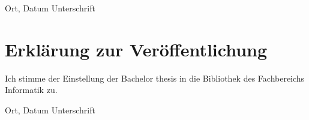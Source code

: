 \documentclass[12pt,final,twoside]{report}
\newcommand{\trtype}{Bachelor thesis} %
\theoremstyle{plain}
\theoremstyle{definition}
\theoremstyle{remark}
\begin{document}
\vspace{4cm}
\noindent Ort, Datum \hfill Unterschrift

\newpage
\thispagestyle{empty}
\hspace{1cm}
\newpage

\vspace{2cm}
\chapter*{Erkl\"arung zur Ver\"offentlichung}
\label{sec:urheber}
Ich stimme der Einstellung der \trtype{} in die Bibliothek des Fachbereichs Informatik zu.

\vspace{4cm}
\noindent Ort, Datum \hfill Unterschrift

\newpage
\thispagestyle{empty}
\hspace{1cm}
\newpage
\end{document}
